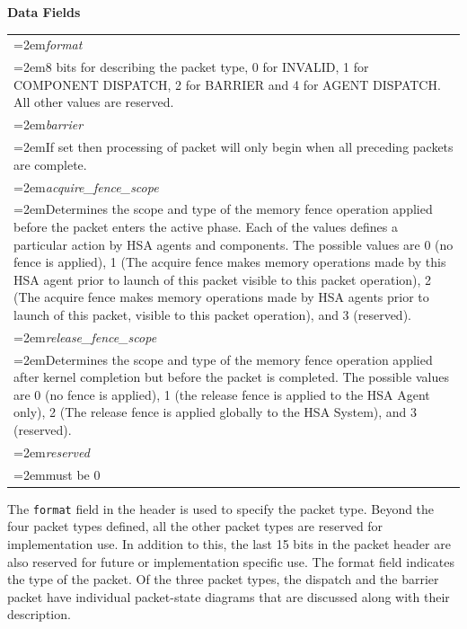 \documentclass{book}
\newcommand{\hsaarg}[1]{\textit{#1}}
\begin{document}
\noindent\textbf{Data Fields}\\[-5mm]
\begin{longtable}{@{}>{\hangindent=2em}p{\textwidth}}
\hsaarg{format}\\\hspace{2em}8 bits for describing the packet type, 0 for INVALID, 1 for COMPONENT DISPATCH, 2 for BARRIER and 4 for AGENT DISPATCH. All other values are reserved.\\[2mm]
\hsaarg{barrier}\\\hspace{2em}If set then processing of packet will only begin when all preceding packets are complete.\\[2mm]
\hsaarg{acquire\_fence\_scope}\\\hspace{2em}Determines the scope and type of the memory fence operation applied before the packet enters the active phase. Each of the values defines a particular action by HSA agents and components. The possible values are 0 (no fence is applied), 1 (The acquire fence makes memory operations made by this HSA agent prior to launch of this packet visible to this packet operation), 2 (The acquire fence makes memory operations made by HSA agents prior to launch of this packet, visible to this packet operation), and 3 (reserved).\\[2mm]
\hsaarg{release\_fence\_scope}\\\hspace{2em}Determines the scope and type of the memory fence operation applied after kernel completion but before the packet is completed. The possible values are 0 (no fence is applied), 1 (the release fence is applied to the HSA Agent only), 2 (The release fence is applied globally to the HSA System), and 3 (reserved).\\[2mm]
\hsaarg{reserved}\\\hspace{2em}must be 0
\end{longtable}

 

The \texttt{format} field in the header is used to specify
the packet type. Beyond the four packet types defined, all the
other packet types are reserved for implementation use. In addition
to this, the last 15 bits in the packet header are also reserved for
future or implementation specific use. The format field indicates
the type of the packet. Of the three packet types, the
dispatch and the barrier packet have individual packet-state
diagrams that are discussed along with their description.
\end{document}
